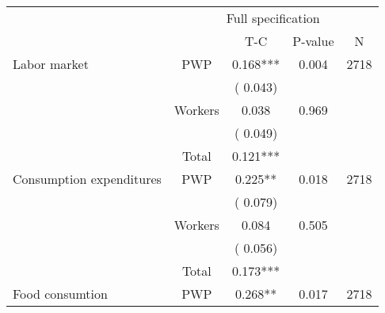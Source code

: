 
\begin{tabular}{l*{4}{c}}\hline&\multicolumn{4}{c}{Full specification} \\ \cmidrule(r){2-5} & {} & {T-C} & {P-value} & {N}  \\ \midrule
 Labor market                 &       PWP     &              0.168***                 &        0.004    & 2718                               \\  
                               &                               &       (       0.043)                              & &                                                                             \\ 
                               &       Workers         &              0.038                 &        0.969    &                                               \\ 
                               &                               &       (       0.049)                              & &                                                                             \\ 
\cmidrule{2-3}
                               &       Total           &              0.121***                 &    &                                               \\ 
\cmidrule{2-3}
 Consumption expenditures                 &       PWP     &              0.225**                 &        0.018    & 2718                               \\ 
                               &                               &       (       0.079)                              & &                                                                             \\ 
                               &       Workers         &              0.084                 &        0.505    &                                               \\ 
                               &                               &       (       0.056)                              & &                                                                             \\ 
\cmidrule{2-3}
                               &       Total           &              0.173***                 &    &                                               \\ 
\cmidrule{2-3}
 Food consumtion                 &       PWP     &              0.268**                 &        0.017    & 2718                               \\ 

\end{tabular}
